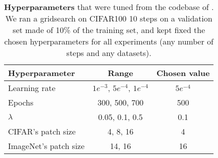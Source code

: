 \begin{table}[t]
    \centering
    \begin{tabular}{l|cc}
        \hline
        Hyperparameter        & Range                           & Chosen value\Tstrut\Bstrut \\
        \hline
        Learning rate         & $1e^{-3}$, $5e^{-4}$, $1e^{-4}$ & $5e^{-4}$\Tstrut           \\
        Epochs                & 300, 500, 700                   & 500                        \\
        $\lambda$             & 0.05, 0.1, 0.5                  & 0.1                        \\
        CIFAR's patch size    & 4, 8, 16                        & 4                          \\
        ImageNet's patch size & 14, 16                          & 16                         \\
        \hline
    \end{tabular}
    \caption{\textbf{Hyperparameters} that were tuned from the codebase of \citet{touvron2021deit}.
        We ran a gridsearch on CIFAR100 10 steps on a validation set made of 10\% of the training set,
        and kept fixed the chosen hyperparameters for all experiments (any number of steps and any
        datasets).}
    \label{tab:dytox_tuning}
\end{table}
